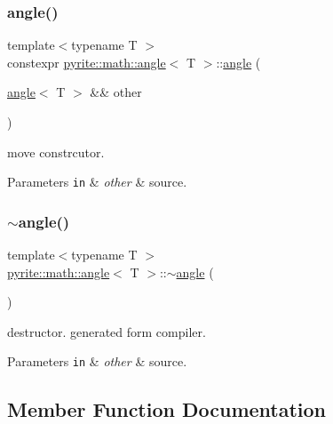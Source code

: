 \subsubsection{\texorpdfstring{angle()}{angle()}\hspace{0.1cm}{\footnotesize\ttfamily [5/5]}}
{\footnotesize\ttfamily template$<$typename T $>$ \\
constexpr \mbox{\hyperlink{classpyrite_1_1math_1_1angle}{pyrite\+::math\+::angle}}$<$ T $>$\+::\mbox{\hyperlink{classpyrite_1_1math_1_1angle}{angle}} (\begin{DoxyParamCaption}\item[{\mbox{\hyperlink{classpyrite_1_1math_1_1angle}{angle}}$<$ T $>$ \&\&}]{other }\end{DoxyParamCaption})\hspace{0.3cm}{\ttfamily [default]}}

move constrcutor.


\begin{DoxyParams}[1]{Parameters}
\mbox{\tt in}  & {\em other} & source. \\
\hline
\end{DoxyParams}
\mbox{\label{classpyrite_1_1math_1_1angle_a53b066dbf9792cf5483ab6665a0f31da}} 
\subsubsection{\texorpdfstring{$\sim$angle()}{~angle()}}
{\footnotesize\ttfamily template$<$typename T $>$ \\
\mbox{\hyperlink{classpyrite_1_1math_1_1angle}{pyrite\+::math\+::angle}}$<$ T $>$\+::$\sim$\mbox{\hyperlink{classpyrite_1_1math_1_1angle}{angle}} (\begin{DoxyParamCaption}{ }\end{DoxyParamCaption})\hspace{0.3cm}{\ttfamily [default]}}

destructor. generated form compiler.


\begin{DoxyParams}[1]{Parameters}
\mbox{\tt in}  & {\em other} & source. \\
\hline
\end{DoxyParams}


\subsection{Member Function Documentation}
\mbox{\label{classpyrite_1_1math_1_1angle_a5126aac02ec54f94df6aecac8e9d9e9a}} 
